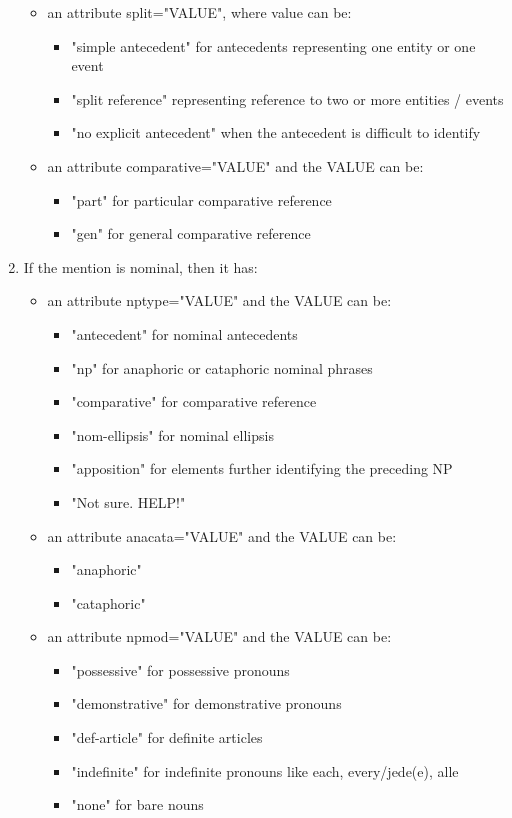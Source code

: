 \documentclass[a4paper]{article}
\begin{document}
\begin{enumerate}
\begin{itemize}
 \item an attribute split="VALUE", where value can be:
 \begin{itemize}
 \item "simple antecedent" for antecedents representing one entity or one event
 \item "split reference" representing reference to two or more entities / events
 \item "no explicit antecedent" when the antecedent is difficult to identify
 \end{itemize}
 
 \item an attribute comparative="VALUE" and the VALUE can be:
  \begin{itemize}
 \item "part" for particular comparative reference
 \item "gen" for general comparative reference
 \end{itemize}

\end{itemize}

\item If the mention is nominal, then it has: 

\begin{itemize}

\item an attribute nptype="VALUE" and the VALUE can be:
\begin{itemize}
\item "antecedent" for nominal antecedents 
\item "np" for anaphoric or cataphoric nominal phrases
\item "comparative" for comparative reference
\item "nom-ellipsis" for nominal ellipsis
\item "apposition" for elements further identifying the preceding NP
\item "Not sure. HELP!"
\end{itemize}
  
 \item an attribute anacata="VALUE" and the VALUE can be:
  \begin{itemize}
 \item "anaphoric" 
 \item "cataphoric" 
 \end{itemize}
 
 \item an attribute npmod="VALUE" and the VALUE can be:
 \begin{itemize}
 \item "possessive" for possessive pronouns
 \item "demonstrative"  for demonstrative pronouns
\item "def-article"  for definite articles
\item "indefinite"  for indefinite pronouns like each, every/jede(e), alle
\item "none" for bare nouns
 \end{itemize}
 

\end{itemize}
\end{enumerate}
\end{document}
